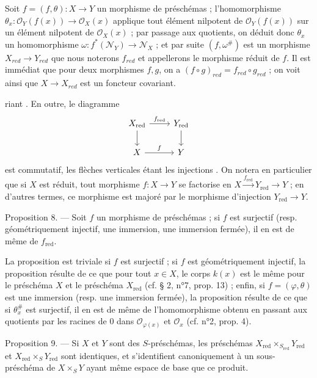 Soit $f=(f, \theta) : X \to Y$ un morphisme de préschémas ; l'homomorphisme $\theta_x : \mathcal{O}_Y(f(x)) \to \mathcal{O}_X(x)$ applique tout élément nilpotent de $\mathcal{O}_Y(f(x))$ sur un élément nilpotent de $\mathcal{O}_X(x)$ ; par passage aux quotients, on déduit donc $\theta_x$ un homomorphisme $\omega : f^*(\mathcal{N}_Y) \to \mathcal{N}_X$ ; et par suite $(f, \omega^{\#})$ est un morphisme $X_{red} \to Y_{red}$ que nous noterons $f_{red}$ et appellerons le morphisme réduit de $f$. Il est immédiat que pour deux morphismes $f, g$, on a $(f \circ g)_{red} = f_{red} \circ g_{red}$ ; on voit ainsi que $X \to X_{red}$ est un foncteur covariant.

\newpage


riant . En outre, le diagramme
$$\begin{tikzcd}
X_{\text{red}} \arrow[r, "f_{\text{red}}"] \arrow[d] & Y_{\text{red}} \arrow[d] \\
X \arrow[r, "f"] & Y
\end{tikzcd}$$
est commutatif, les flèches verticales étant les injections . On notera en particulier que si $X$ est réduit, tout morphisme $f : X \to Y$ se factorise en $X \xrightarrow{f_{\text{red}}} Y_{\text{red}} \to Y$ ; en d'autres termes, ce morphisme est majoré par le morphisme d'injection $Y_{\text{red}} \to Y$.

Proposition 8. — Soit $f$ un morphisme de préschémas ; si $f$ est surjectif (resp. géométriquement injectif, une immersion, une immersion fermée), il en est de même de $f_{\text{red}}$.

La proposition est triviale si $f$ est surjectif ; si $f$ est géométriquement injectif, la proposition résulte de ce que pour tout $x \in X$, le corps $k(x)$ est le même pour le préschéma $X$ et le préschéma $X_{\text{red}}$ (cf. § 2, n°7, prop. 13) ; enfin, si $f=(\varphi, \theta)$ est une immersion (resp. une immersion fermée), la proposition résulte de ce que si $\theta_x^{\#}$ est surjectif, il en est de même de l'homomorphisme obtenu en passant aux quotients par les racines de $0$ dans $\mathcal{O}_{\varphi(x)}$ et $\mathcal{O}_x$ (cf. n°2, prop. 4).

Proposition 9. — Si $X$ et $Y$ sont des $S$-préschémas, les préschémas $X_{\text{red}} \times_{S_{\text{red}}} Y_{\text{red}}$ et $X_{\text{red}} \times_S Y_{\text{red}}$ sont identiques, et s'identifient canoniquement à un sous-préschéma de $X \times_S Y$ ayant même espace de base que ce produit.

